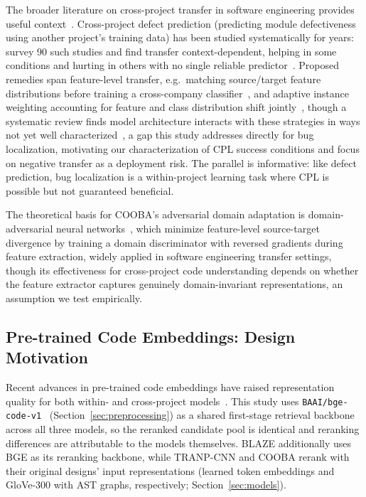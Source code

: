 \documentclass[a4paper,fleqn]{cas-dc}
\begin{document}
The broader literature on cross-project transfer in software engineering
provides useful context~\citep{pan2010survey}. Cross-project defect
prediction (predicting module defectiveness using another project's
training data) has been studied systematically for years:
\citet{hosseini2017systematic} survey 90 such studies and find transfer
context-dependent, helping in some conditions and hurting in others with no
single reliable predictor~\citep{sottomayor2024survey}. Proposed remedies
span feature-level transfer, e.g.\ matching source/target feature
distributions before training a cross-company classifier~\citep{yu2017feature},
and adaptive instance weighting accounting for feature and class
distribution shift jointly~\citep{tong2023array}, though a systematic
review finds model architecture interacts with these strategies in ways
not yet well characterized~\citep{giray2023deep}, a gap this study
addresses directly for bug localization, motivating our characterization
of CPL success conditions and focus on negative transfer as a deployment
risk. The parallel is informative: like defect prediction, bug
localization is a within-project learning task where CPL is possible but
not guaranteed beneficial.

 The theoretical basis for COOBA's adversarial domain
adaptation is domain-adversarial neural networks~\citep{ganin2016domain},
which minimize feature-level source-target divergence by training a domain
discriminator with reversed gradients during feature extraction, widely
applied in software engineering transfer settings, though its
effectiveness for cross-project code understanding depends on whether the
feature extractor captures genuinely domain-invariant representations, an
assumption we test empirically.

\subsection{Pre-trained Code Embeddings: Design Motivation}

Recent advances in pre-trained code embeddings have raised representation
quality for both within- and cross-project
models~\citep{feng2020codebert,guo2021graphcodebert,wang2021codet5,guo2022unixcoder}.
This study uses \texttt{BAAI/bge-code-v1}~\citep{bge_code}
(Section~\ref{sec:preprocessing}) as a shared first-stage retrieval
backbone across all three models, so the reranked candidate pool is
identical and reranking differences are attributable to the models
themselves. BLAZE additionally uses BGE as its reranking backbone, while
TRANP-CNN and COOBA rerank with their original designs' input
representations (learned token embeddings and GloVe-300 with AST graphs,
respectively; Section~\ref{sec:models}).
\end{document}

